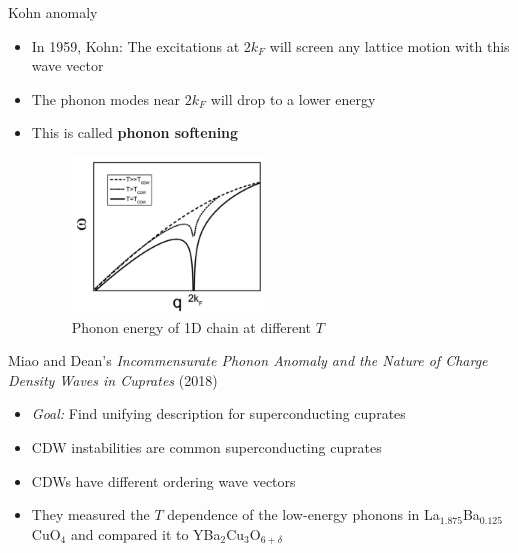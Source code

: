 \documentclass{beamer}
\begin{document}
\begin{frame}{Kohn anomaly}
\begin{itemize}
\item In 1959, Kohn: The excitations at $2 k_F$ will screen any lattice motion with this wave vector
\item The phonon modes near $2 k_F$ will drop to a lower energy
\item This is called \textbf{phonon softening}
\begin{figure}
\includegraphics[width=2in]{figs/kohn_anomaly.png}
\caption{\label{fig:kohn_anomaly} Phonon energy of 1D chain at different $T$}
\end{figure}
\end{itemize}
\end{frame}

\begin{frame}{Miao and Dean's \textit{Incommensurate Phonon Anomaly and the Nature of Charge Density Waves in Cuprates} (2018)}
\begin{itemize}
\item \textit{Goal:} Find unifying description for superconducting cuprates
\item CDW instabilities are common superconducting cuprates
\item CDWs have different ordering wave vectors
\item They measured the $T$ dependence of the low-energy phonons in La$_{1.875}$Ba$_{0.125}$CuO$_4$ and compared it to YBa$_2$Cu$_3$O$_{6 + \delta}$
\end{itemize}
\end{frame}
\end{document}
